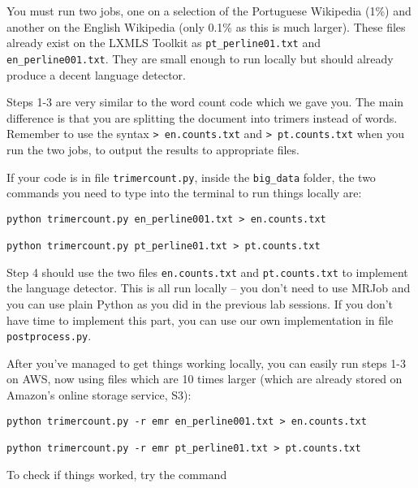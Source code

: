 You must run two jobs, one on a selection of the Portuguese Wikipedia (1\%) and
another on the English Wikipedia (only 0.1\% as this is much larger). These files already exist on the LXMLS Toolkit as \texttt{pt\_perline01.txt} and \texttt{en\_perline001.txt}. They are small enough to run locally but should already produce a decent language detector.

Steps 1-3 are very similar to the word count code which we gave you. The main difference is that you are splitting the document into trimers instead of words. Remember to use the syntax \texttt{> en.counts.txt} and \texttt{> pt.counts.txt} when you run the two jobs, to output the results to appropriate files.

If your code is in file \texttt{trimercount.py}, inside the \texttt{big\_data} folder, the two commands you need to type into the terminal to run things locally are:

%
%

\begin{verbatim}
python trimercount.py en_perline001.txt > en.counts.txt

python trimercount.py pt_perline01.txt > pt.counts.txt
\end{verbatim}

Step 4 should use the two files \texttt{en.counts.txt} and \texttt{pt.counts.txt} to implement the language detector. This is all run locally -- you don't need to use MRJob and you can use plain Python as you did in the previous lab sessions. If you don't have time to implement this part, you can use our own implementation in file \texttt{postprocess.py}.

After you've managed to get things working locally, you can easily run steps 1-3 on AWS, now using files which are 10 times larger (which are already stored on Amazon's online storage service, S3):

%

\begin{verbatim}
python trimercount.py -r emr en_perline001.txt > en.counts.txt

python trimercount.py -r emr pt_perline01.txt > pt.counts.txt
\end{verbatim}

To check if things worked, try the command


